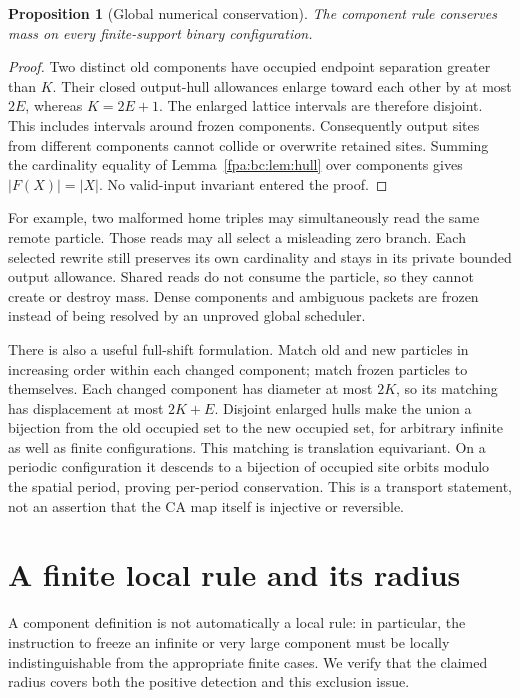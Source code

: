 \documentclass[11pt,a4paper]{article}
\numberwithin{equation}{section}
\newtheorem{proposition}[theorem]{Proposition}
\begin{document}
\begin{proposition}[Global numerical conservation]\label{fpa:bc:prop:cons}
The component rule conserves mass on every finite-support binary configuration.
\end{proposition}
\begin{proof}
Two distinct old components have occupied endpoint separation greater than
$K$. Their closed output-hull allowances enlarge toward each other by at most
$2E$, whereas $K=2E+1$. The enlarged lattice intervals are therefore disjoint.
This includes intervals around frozen components. Consequently output sites
from different components cannot collide or overwrite retained sites.
Summing the cardinality equality of Lemma~\ref{fpa:bc:lem:hull} over components gives
$|F(X)|=|X|$. No valid-input invariant entered the proof.
\end{proof}

For example, two malformed home triples may simultaneously read
the same remote particle. Those reads may all select a misleading zero branch.
Each selected rewrite still preserves its own cardinality and stays in its
private bounded output allowance. Shared reads do not consume the particle,
so they cannot create or destroy mass. Dense components and ambiguous packets
are frozen instead of being resolved by an unproved global scheduler.

There is also a useful full-shift formulation. Match old and new particles
in increasing order within each changed component; match frozen particles to
themselves. Each changed component has diameter at most $2K$, so its matching
has displacement at most $2K+E$. Disjoint enlarged hulls make the union a
bijection from the old occupied set to the new occupied set, for arbitrary
infinite as well as finite configurations. This matching is translation
equivariant. On a periodic configuration it descends to a bijection of occupied
site orbits modulo the spatial period, proving per-period conservation.
This is a transport statement, not an assertion that the CA map itself is
injective or reversible.

\section{A finite local rule and its radius}\label{fpa:bc:sec:locality}
A component definition is not automatically a local rule: in particular, the
instruction to freeze an infinite or very large component must be locally
indistinguishable from the appropriate finite cases. We verify that the
claimed radius covers both the positive detection and this exclusion issue.
\end{document}
